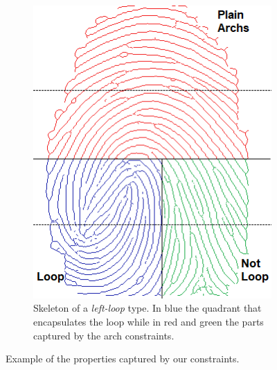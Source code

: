 \documentclass[8pt]{article}
\begin{document}
\begin{figure}
\begin{subfigure}{.48\textwidth}
	\includegraphics[width=1\linewidth]{img/loop_mod2}
	\caption{Skeleton of a \textit{left-loop} type. In blue the quadrant that encapsulates the loop while in red and green the parts captured by the arch constraints.}
	\label{fig:loop}
\end{subfigure}%
\caption{Example of the properties captured by our constraints.}
\label{fig:example}
\end{figure}











\end{document}
